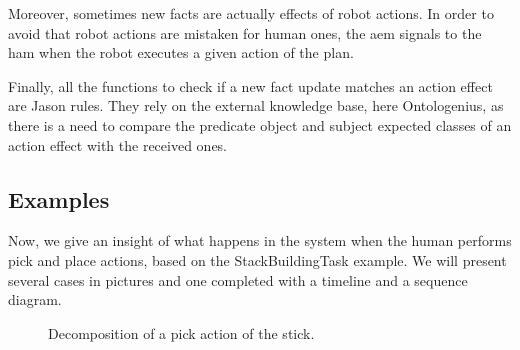 \documentclass[a4paper,11pt,twoside]{StyleThese}
\begin{document}
Moreover, sometimes new facts are actually effects of robot actions. In order to avoid that robot actions are mistaken for human ones, the \acrshort{aem} signals to the \acrlong{ham} when the robot executes a given action of the plan. 

Finally, all the functions to check if a new fact update matches an action effect are Jason rules. They rely on the external knowledge base, here Ontologenius, as there is a need to compare the predicate object and subject expected classes of an action effect with the received ones.

\thispagestyle{example}
\subsection*{Examples}
Now, we give an insight of what happens in the system when the human performs pick and place actions, based on the StackBuildingTask example. We will present several cases in pictures and one completed with a timeline and a sequence diagram.

\begin{figure}[!htp]
	\hfill
	\hfill
	\hfill
	\caption{Decomposition of a pick action of the stick.}
	\label{chap6:fig:action_monitoring_photos_pick}
\end{figure}
\end{document}
